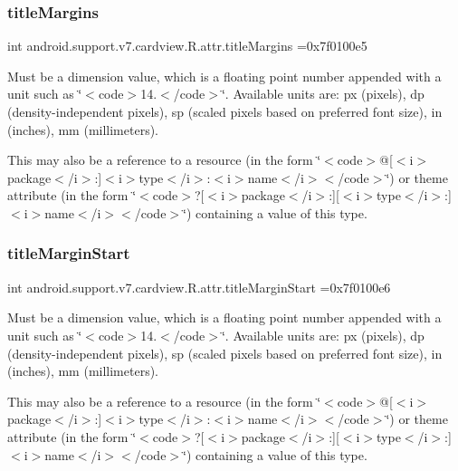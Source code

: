 \subsubsection{\texorpdfstring{title\+Margins}{titleMargins}}
{\footnotesize\ttfamily int android.\+support.\+v7.\+cardview.\+R.\+attr.\+title\+Margins =0x7f0100e5\hspace{0.3cm}{\ttfamily [static]}}

Must be a dimension value, which is a floating point number appended with a unit such as \char`\"{}$<$code$>$14.\+5sp$<$/code$>$\char`\"{}. Available units are\+: px (pixels), dp (density-\/independent pixels), sp (scaled pixels based on preferred font size), in (inches), mm (millimeters). 

This may also be a reference to a resource (in the form \char`\"{}$<$code$>$@\mbox{[}$<$i$>$package$<$/i$>$\+:\mbox{]}$<$i$>$type$<$/i$>$\+:$<$i$>$name$<$/i$>$$<$/code$>$\char`\"{}) or theme attribute (in the form \char`\"{}$<$code$>$?\mbox{[}$<$i$>$package$<$/i$>$\+:\mbox{]}\mbox{[}$<$i$>$type$<$/i$>$\+:\mbox{]}$<$i$>$name$<$/i$>$$<$/code$>$\char`\"{}) containing a value of this type. \mbox{\label{classandroid_1_1support_1_1v7_1_1cardview_1_1R_1_1attr_a050e6de5fb5747b3da0d7378d952214c}} 
\subsubsection{\texorpdfstring{title\+Margin\+Start}{titleMarginStart}}
{\footnotesize\ttfamily int android.\+support.\+v7.\+cardview.\+R.\+attr.\+title\+Margin\+Start =0x7f0100e6\hspace{0.3cm}{\ttfamily [static]}}

Must be a dimension value, which is a floating point number appended with a unit such as \char`\"{}$<$code$>$14.\+5sp$<$/code$>$\char`\"{}. Available units are\+: px (pixels), dp (density-\/independent pixels), sp (scaled pixels based on preferred font size), in (inches), mm (millimeters). 

This may also be a reference to a resource (in the form \char`\"{}$<$code$>$@\mbox{[}$<$i$>$package$<$/i$>$\+:\mbox{]}$<$i$>$type$<$/i$>$\+:$<$i$>$name$<$/i$>$$<$/code$>$\char`\"{}) or theme attribute (in the form \char`\"{}$<$code$>$?\mbox{[}$<$i$>$package$<$/i$>$\+:\mbox{]}\mbox{[}$<$i$>$type$<$/i$>$\+:\mbox{]}$<$i$>$name$<$/i$>$$<$/code$>$\char`\"{}) containing a value of this type. \mbox{\label{classandroid_1_1support_1_1v7_1_1cardview_1_1R_1_1attr_a50fe0b534598095ab1c78c567cd09649}} 
